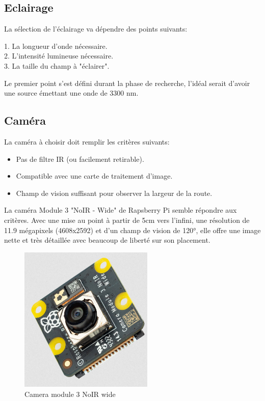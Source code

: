\subsection{Eclairage}
La sélection de l'éclairage va dépendre des points suivants:
\begin{listage}
    1. La longueur d'onde nécessaire.\\
    2. L'intensité lumineuse nécessaire.\\
    3. La taille du champ à "éclairer".
\end{listage}
Le premier point s'est défini durant la phase de recherche, l'idéal serait d'avoir une source émettant une onde de 3300 \si{\nano\metre}.

\subsection{Caméra}
La caméra à choisir doit remplir les critères suivants:
\begin{itemize}
    \item Pas de filtre IR (ou facilement retirable).
    \item Compatible avec une carte de traitement d'image.
    \item Champ de vision suffisant pour observer la largeur de la route.
\end{itemize}

La caméra Module 3 "NoIR - Wide" de Rapsberry Pi \cite{camera} semble répondre aux critères. Avec une mise au point à partir de 5cm vers l'infini,
une résolution de 11.9 mégapixels (4608x2592) et d'un champ de vision de \ang{120}, elle offre une image nette et très détaillée avec beaucoup de liberté sur
son placement.
\begin{figure}[H]
    \centering
    \includegraphics[height=7cm,angle=-90]{assets/figures/camera.png}
    \caption{Camera module 3 NoIR wide}
\end{figure}

